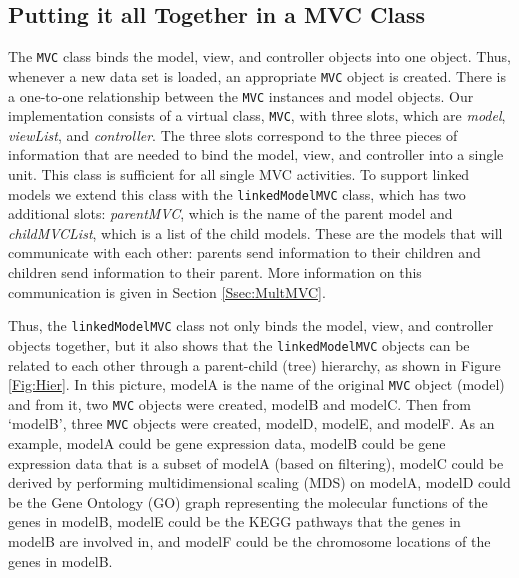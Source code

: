 \documentclass[11pt]{article}
\newcommand{\Robject}[1]{{\texttt{#1}}}
\newcommand{\Rslot}[1]{\textsl{#1}}
\newcommand{\Rclass}[1]{\texttt{#1}}
\begin{document}
\subsection{Putting it all Together in a MVC Class}
\label{Ssec:OneMVC}
 
The \Rclass{MVC} class binds the model, view, and controller objects
into one object.  Thus, whenever a new data set is loaded, an
appropriate \Robject{MVC} object is created.  There is a one-to-one
relationship between the \Robject{MVC} instances and model objects.
Our implementation consists
of a virtual class, \Rclass{MVC}, with three slots, which are
\Rslot{model}, \Rslot{viewList}, and \Rslot{controller}. The three
slots correspond to the three pieces of information that are needed to
bind the model, view, and controller into a single unit. This class is
sufficient for all single MVC activities. To support linked models
we extend this class with the \Rclass{linkedModelMVC} class, which has
two additional slots: \Rslot{parentMVC}, which is the name of the
parent model and \Rslot{childMVCList}, which is a list of the child models.
These are the models that will communicate with each other: parents send
information to their children and children send information to their parent.
More information on this communication is given in Section \ref{Ssec:MultMVC}.



Thus, the \Rclass{linkedModelMVC} class not only binds the model,
view, and controller objects together, but it also shows
that the \Robject{linkedModelMVC} objects can be related to each other 
through a
parent-child (tree) hierarchy, as shown in Figure \ref{Fig:Hier}.  In this
picture, modelA is the name of the original \Robject{MVC} object
(model) and from it, two \Robject{MVC} objects were created,
modelB and modelC. Then from `modelB', three
\Robject{MVC} objects were created, modelD, modelE, and
modelF.  As an example, modelA could be gene 
expression data, modelB could be gene expression data that is a subset of
modelA (based on filtering), modelC could be derived by performing
multidimensional scaling (MDS) on modelA, modelD could be the Gene Ontology
(GO) graph representing the molecular functions of the genes in modelB,
modelE could be the KEGG pathways that the genes in modelB are involved
in, and modelF could be the chromosome locations of the genes in modelB.
\end{document}
